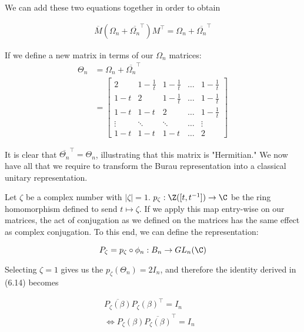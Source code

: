 We can add these two equations together in order to obtain

\begin{equation}
	\begin{aligned}
		\overline{M}(\Omega_n + \overline{\Omega_n}^\intercal )M^\intercal = \Omega_n + \overline{\Omega_n}^\intercal 
	\end{aligned}
\end{equation}

If we define a new matrix in terms of our $\Omega_n$ matrices:
\begin{equation}
	\begin{aligned}
		\Theta_n &= \Omega_n + \overline{\Omega_n}^\intercal \\
					&=  \begin{bmatrix}
						2 & 1-\frac{1}{t} & 1-\frac{1}{t} &\hdots & 1-\frac{1}{t} \\
						1-t & 2 & 1-\frac{1}{t} & \hdots & 1-\frac{1}{t} \\
						1-t & 1-t & 2 & \hdots & 1-\frac{1}{t} \\
						\vdots&\ddots&\ddots&\hdots&\vdots\\
						1-t & 1-t & 1-t & \hdots & 2
					\end{bmatrix}
	\end{aligned}
\end{equation}

It is clear that $\overline{\Theta_n}^\intercal = \Theta_n$, illustrating that this matrix is "Hermitian." We now have all that we require to transform the Burau representation into a classical unitary representation.

Let $\zeta$ be a complex number with $|\zeta|=1$. $p_\zeta:\Z([t,t^{-1}]) \rightarrow \C$ be the ring homomorphism defined to send $t\mapsto\zeta$. If we apply this map entry-wise on our matrices, the act of conjugation as we defined on the matrices has the same effect as complex conjugation. To this end, we can define the representation:

$$P_\zeta = p_\zeta\circ\phi_n: B_n\rightarrow GL_n(\C)$$

Selecting $\zeta=1$ gives us the $p_\zeta(\Theta_n) = 2I_n$, and therefore the identity derived in (6.14) becomes

\begin{equation}
	\begin{aligned}
		\overline{P_\zeta(\beta)}P_\zeta(\beta)^\intercal = I_n &\\
		\Leftrightarrow P_\zeta(\beta)\overline{P_\zeta(\beta)}^\intercal  = I_n
	\end{aligned}
\end{equation}

